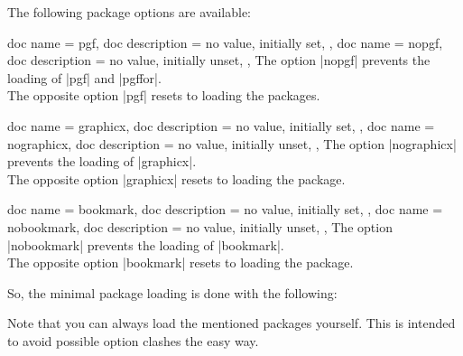 \documentclass[a4paper,11pt]{ltxdoc}
\begin{document}
The following package options are available:

\begin{docPackageOptions}
  {
    {
      doc name = pgf,
      doc description = {no value, initially set},
    },
    {
      doc name = nopgf,
      doc description = {no value, initially unset},
    },
  }
  The option |nopgf| prevents the loading of |pgf| and |pgffor|.\\
  The opposite option |pgf| resets to loading the packages.
\end{docPackageOptions}

\begin{docPackageOptions}
  {
    {
      doc name = graphicx,
      doc description = {no value, initially set},
    },
    {
      doc name = nographicx,
      doc description = {no value, initially unset},
    },
  }
  The option |nographicx| prevents the loading of |graphicx|.\\
  The opposite option |graphicx| resets to loading the package.
\end{docPackageOptions}

\begin{docPackageOptions}
  {
    {
      doc name = bookmark,
      doc description = {no value, initially set},
    },
    {
      doc name = nobookmark,
      doc description = {no value, initially unset},
    },
  }
  The option |nobookmark| prevents the loading of |bookmark|.\\
  The opposite option |bookmark| resets to loading the package.
\end{docPackageOptions}

So, the minimal package loading is done with the following:
\begin{dispListing}
\usepackage[nopgf,nographicx,nobookmark]{incgraph}
\end{dispListing}

Note that you can always load the mentioned packages yourself. This is
intended to avoid possible option clashes the easy way.


\clearpage
\end{document}
